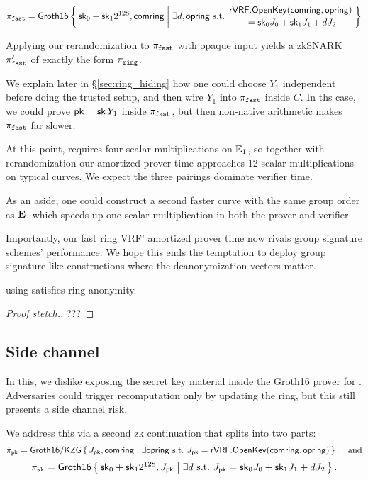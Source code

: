 $$ \pifast = \rrSNARK \Setst{ \sk_0 + \sk_1 2^{128}, \comring }{
 \exists d,\openring \textrm{\ s.t.\ }
 \genfrac{}{}{0pt}{}{ \rVRF.\OpenKey(\comring,\openring) }{ \,\, = \sk_0 \genJ_0 + \sk_1 \genJ_1 + d \genJ_2 }
} $$ %

Applying our rerandomization to $\pi_{\mathtt{fast}}$ with opaque input yields
a zkSNARK $\pi_{\mathtt{fast}}'$ of exactly the form $\pi_{\mathtt{ring}}$.

We explain later in \S\ref{sec:ring_hiding} how one could
choose $Y_1$ independent before doing the trusted setup,
 and then wire $Y_1$ into $\pi_{\mathtt{fast}}$ inside $C$.
In ths case, we could prove $\mathsf{pk} = \mathsf{sk}\, Y_1$ inside $\pi_{\mathtt{fast}}$, but then
non-native arithmetic makes $\pi_{\mathtt{fast}}$ far slower.

At this point, \PedVRF requires four scalar multiplications on ${\mathbb{E}}_1$,
so together with rerandomization our amortized prover time
 approaches 12 scalar multiplications on typical curves. 
We expect the three pairings dominate verifier time.

As an aside, one could construct a second faster curve with the same
group order as ${\mathbf{E}}$, which speeds up one scalar multiplication
 in both the prover and verifier. 

Importantly, our fast ring VRF' amortized prover time now rivals
group signature schemes' performance.  We hope this ends the temptation
to deploy group signature like constructions where the deanonymization vectors matter.

\begin{proposition}\label{prop:pifast_anonymity}
\rVRF using \pifast satisfies ring anonymity.
\end{proposition}

\begin{proof}[Proof stetch.]
???
\end{proof}


\subsection{Side channel}
\label{subsec:rvrf_side_channel}

In this, we dislike exposing the secret key material inside
 the Groth16 prover for \pifast.
Adversaries could trigger \pifast recomputation only by updating the ring,
but this still presents a side channel risk.

We address this via a second zk continuation that splits \pifast into two parts: %
%
$$ \pipk = \rrSNARKweak \Setst{ J_\pk, \comring }{
 \exists \openring \textrm{\ s.t.\ }
  J_\pk = \rVRF.\OpenKey(\comring,\openring)
} \mathcomma \quad\textrm{and} $$ 
%
$$ \pisk = \rrSNARK \Setst{ \sk_0 + \sk_1 2^{128}, J_\pk }{ 
 \exists d \textrm{\ s.t.\ }
 J_\pk = \sk_0 \genJ_0 + \sk_1 \genJ_1 + d \genJ_2
} \mathperiod $$

